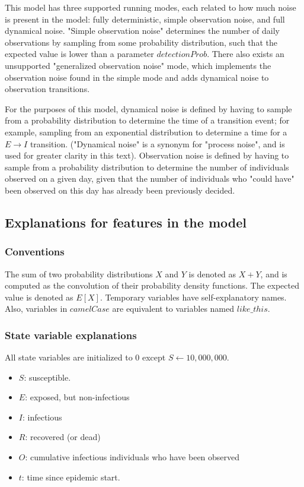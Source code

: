 \documentclass{article}
\begin{document}
This model has three supported running modes, each related to how much noise is present in the model: fully deterministic, simple observation noise, and full dynamical noise. "Simple observation noise" determines the number of daily observations by sampling from some probability distribution, such that the expected value is lower than a parameter $detectionProb$. There also exists an unsupported "generalized observation noise" mode, which implements the observation noise found in the simple mode and adds dynamical noise to observation transitions.

For the purposes of this model, dynamical noise is defined by having to sample from a probability distribution to determine the time of a transition event; for example, sampling from an exponential distribution to determine a time for a $E \rightarrow I$ transition. ("Dynamical noise" is a synonym for "process noise", and is used for greater clarity in this text). Observation noise is defined by having to sample from a probability distribution to determine the number of individuals observed on a given day, given that the number of individuals who "could have" been observed on this day has already been previously decided.

\subsection{Explanations for features in the model}

\subsubsection{Conventions}
The sum of two probability distributions $X$ and $Y$ is denoted as $X+Y$, and is computed as the convolution of their probability density functions. The expected value is denoted as $E[X]$. Temporary variables have self-explanatory names. Also, variables in $camelCase$ are equivalent to variables named $like\_this$. 


\subsubsection{State variable explanations}
All state variables are initialized to 0 except $S \gets 10,000,000$. 

\begin{itemize}
    \item $S$: susceptible.
    \item $E$: exposed, but non-infectious
    \item $I$: infectious
    \item $R$: recovered (or dead)
    \item $O$: cumulative infectious individuals who have been observed 
    \item $t$: time since epidemic start.
\end{itemize}
\end{document}
